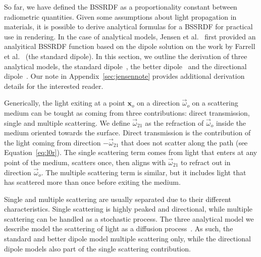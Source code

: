 So far, we have defined the BSSRDF as a proportionality constant between radiometric quantities. Given some assumptions about light propagation in materials, it is possible to derive analytical formulas for a BSSRDF for practical use in rendering. In the case of analytical models, Jensen et al.~\cite{Jensen2001} first provided an analyitical BSSRDF function based on the dipole solution on the work by Farrell et al.~\cite{Farrell1992} (the standard dipole). In this section, we outline the derivation of three analytical models, the standard dipole~\cite{Jensen2001}, the better dipole~\cite{dEon2012} and the directional dipole~\cite{Frisvad2014}. Our note in Appendix~\ref{sec:jensennote} provides additional derivation details for the interested reader. 

Generically, the light exiting at a point $\mathbf{x}_o$ on a direction $\vec{\omega}_o$ on a scattering medium can be tought as coming from three contributions: direct transmission, single and multiple scattering. We define $\vec{\omega}_{21}$ as the refraction of $\vec{\omega}_o$ inside the medium oriented towards the surface. Direct transmission is the contribution of the light coming from direction $-\vec{\omega}_{21}$ that does not scatter along the path (see Equation~\ref{eq:l0r}). The single scattering term comes from light that enters at any point of the medium, scatters once, then aligns with $\vec{\omega}_{21}$ to refract out in direction $\vec{\omega}_o$. The multiple scattering term is similar, but it includes light that has scattered more than once before exiting the medium. 

Single and multiple scattering are usually separated due to their different characteristics. Single scattering is highly peaked and directional, while multiple scattering can be handled as a stochastic process. The three analytical model we describe model the scattering of light as a diffusion process~\cite{Stam1995}. As such, the standard and better dipole model multiple scattering only, while the directional dipole models also part of the single scattering contribution. 



